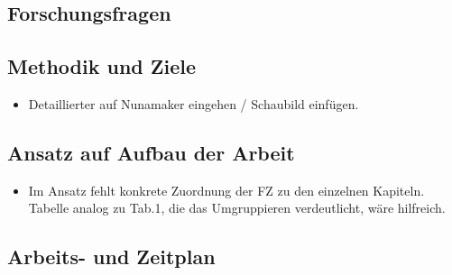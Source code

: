 \subsection{Forschungsfragen}
\label{sec1:intro:subsec:research-questions}

\subsection{Methodik und Ziele}
\label{sec1:intro:subsec:methodology-goals}

\begin{itemize}
    \item Detaillierter auf Nunamaker eingehen / Schaubild einfügen.
\end{itemize}

\subsection{Ansatz auf Aufbau der Arbeit}
\label{sec1:intro:subsec:approach-structure}
\begin{itemize}
    \item Im Ansatz fehlt konkrete Zuordnung der FZ zu den einzelnen Kapiteln. Tabelle analog zu Tab.1, die das Umgruppieren verdeutlicht, wäre hilfreich.
\end{itemize}

\subsection{Arbeits- und Zeitplan}
\label{sec1:intro:subsec:work-time-plan}